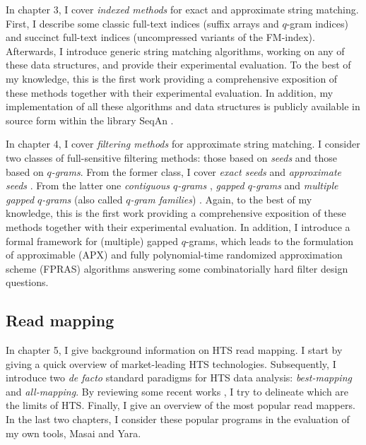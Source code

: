 In chapter 3, I cover \emph{indexed methods} for exact and approximate string matching.
First, I describe some classic full-text indices (suffix arrays and $q$-gram indices) and succinct full-text indices (uncompressed variants of the FM-index).
Afterwards, I introduce generic string matching algorithms, working on any of these data structures, and provide their experimental evaluation.
To the best of my knowledge, this is the first work providing a comprehensive exposition of these methods together with their experimental evaluation.
In addition, my implementation of all these algorithms and data structures is publicly available in source form within the \CC library SeqAn \citep{Doering2008}.

In chapter 4, I cover \emph{filtering methods} for approximate string matching.
I consider two classes of full-sensitive filtering methods: those based on \emph{seeds} and those based on \emph{$q$-grams}.
From the former class, I cover
\emph{exact seeds} \citep{Baeza1992} and
\emph{approximate seeds} \citep{Myers1994,Navarro2000}.
From the latter one
\emph{contiguous $q$-grams} \citep{Jokinen1991},
\emph{gapped $q$-grams} \citep{Burkhardt2001} and
\emph{multiple gapped $q$-grams} (also called \emph{$q$-gram families}) \citep{Kucherov2005}.
Again, to the best of my knowledge, this is the first work providing a comprehensive exposition of these methods together with their experimental evaluation.
In addition, I introduce a formal framework for (multiple) gapped $q$-grams, which leads to the formulation of approximable (APX) and fully polynomial-time randomized approximation scheme (FPRAS) algorithms answering some combinatorially hard filter design questions.

\subsection{Read mapping}

In chapter 5, I give background information on HTS read mapping.
I start by giving a quick overview of market-leading HTS technologies.
Subsequently, I introduce two \emph{de facto} standard paradigms for HTS data analysis: \emph{best-mapping} and \emph{all-mapping}.
By reviewing some recent works \citep{Derrien2012,Lee2012}, I try to delineate which are the limits of HTS.
Finally, I give an overview of the most popular read mappers.
In the last two chapters, I consider these popular programs in the evaluation of my own tools, Masai \citep{Siragusa2013} and Yara.

